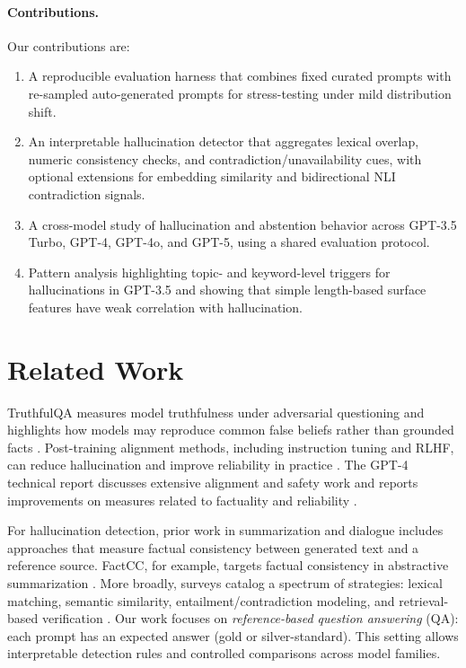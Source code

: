 \documentclass[11pt]{article}
\begin{document}
\paragraph{Contributions.} Our contributions are:
\begin{enumerate}
    \item A reproducible evaluation harness that combines fixed curated prompts with re-sampled auto-generated prompts for stress-testing under mild distribution shift.
    \item An interpretable hallucination detector that aggregates lexical overlap, numeric consistency checks, and contradiction/unavailability cues, with optional extensions for embedding similarity and bidirectional NLI contradiction signals.
    \item A cross-model study of hallucination and abstention behavior across GPT-3.5 Turbo, GPT-4, GPT-4o, and GPT-5, using a shared evaluation protocol.
    \item Pattern analysis highlighting topic- and keyword-level triggers for hallucinations in GPT-3.5 and showing that simple length-based surface features have weak correlation with hallucination.
\end{enumerate}

\section{Related Work}
TruthfulQA measures model truthfulness under adversarial questioning and highlights how models may reproduce common false beliefs rather than grounded facts \cite{truthfulqa}. Post-training alignment methods, including instruction tuning and RLHF, can reduce hallucination and improve reliability in practice \cite{instructgpt}. The GPT-4 technical report discusses extensive alignment and safety work and reports improvements on measures related to factuality and reliability \cite{gpt4report}.

For hallucination detection, prior work in summarization and dialogue includes approaches that measure factual consistency between generated text and a reference source. FactCC, for example, targets factual consistency in abstractive summarization \cite{factcc}. More broadly, surveys catalog a spectrum of strategies: lexical matching, semantic similarity, entailment/contradiction modeling, and retrieval-based verification \cite{ji_survey}. Our work focuses on \emph{reference-based question answering} (QA): each prompt has an expected answer (gold or silver-standard). This setting allows interpretable detection rules and controlled comparisons across model families.
\end{document}
